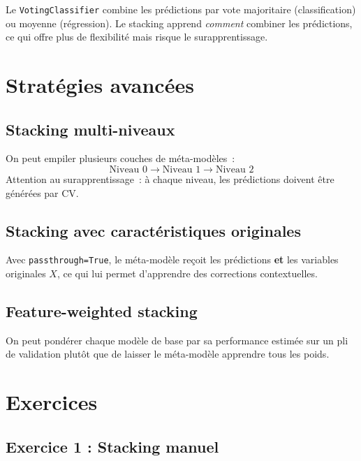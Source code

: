 \documentclass[a4paper,11pt]{article}
\theoremstyle{definition}
\theoremstyle{remark}
\begin{document}
Le \texttt{VotingClassifier} combine les pr\'edictions par vote
majoritaire (classification) ou moyenne (r\'egression). Le stacking
apprend \emph{comment} combiner les pr\'edictions, ce qui offre plus de
flexibilit\'e mais risque le surapprentissage.

\section{Stratégies avancées}

\subsection{Stacking multi-niveaux}

On peut empiler plusieurs couches de m\'eta-mod\`eles~:
\[
\text{Niveau 0} \to \text{Niveau 1} \to \text{Niveau 2}
\]
Attention au surapprentissage~: \`a chaque niveau, les pr\'edictions
doivent \^etre g\'en\'er\'ees par CV.

\subsection{Stacking avec caractéristiques originales}

Avec \texttt{passthrough=True}, le m\'eta-mod\`ele re\c coit les
pr\'edictions \textbf{et} les variables originales $X$, ce qui lui
permet d'apprendre des corrections contextuelles.

\subsection{Feature-weighted stacking}

On peut pond\'erer chaque mod\`ele de base par sa performance estim\'ee
sur un pli de validation plut\^ot que de laisser le m\'eta-mod\`ele
apprendre tous les poids.

\section{Exercices}

\subsection{Exercice 1 : Stacking manuel}
\end{document}
